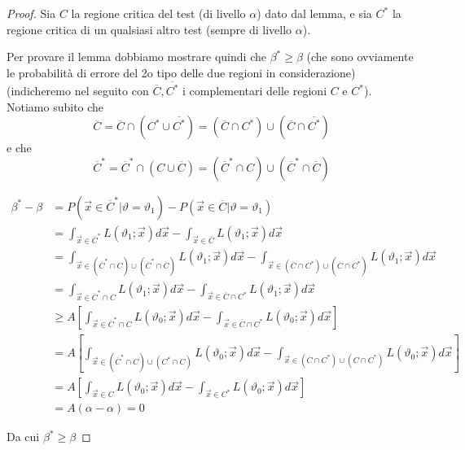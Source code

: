 \begin{proof}

Sia $C$ la regione critica del test (di livello $\alpha$) dato dal lemma, e sia $C^*$ la regione critica di un qualsiasi altro test (sempre di livello $\alpha$).

Per provare il lemma dobbiamo mostrare quindi che $\beta^* \geq \beta$ 
(che sono ovviamente le probabilità di errore del 2o tipo delle due regioni in considerazione)
(indicheremo nel seguito con $\overline{C}, \overline{C^*}$ i complementari delle regioni $C$ e $C^*$).
Notiamo subito che
$$\overline{C} = \overline{C} \cap ({C^*} \cup \overline{C^*}) = (\overline{C} \cap {C^*}) \cup (\overline{C} \cap \overline{C^*})$$
e che 
$$\overline{C}^* = \overline{C}^* \cap ({C} \cup \overline{C}) = (\overline{C}^* \cap {C}) \cup (\overline{C}^* \cap \overline{C})$$

\begin{align*}
\beta^* - \beta 
&= P(\vec{x} \in \overline{C}^* | \vartheta = \vartheta_1) 
	- P(\vec{x} \in \overline{C} | \vartheta = \vartheta_1)
\\ &= \int_{\vec{x} \in \overline{C}^* } L(\vartheta_1;\vec{x}) d \vec{x} 
	- \int_{\vec{x} \in \overline{C} } L(\vartheta_1;\vec{x}) d \vec{x}
\\ &= \int_{\vec{x} \in (\overline{C}^* \cap {C}) \cup (\overline{C}^* \cap \overline{C}) } L(\vartheta_1;\vec{x}) d \vec{x} 
	- \int_{\vec{x} \in (\overline{C} \cap {C^*}) \cup (\overline{C} \cap \overline{C^*}) } L(\vartheta_1;\vec{x}) d \vec{x}
\\ &= \int_{\vec{x} \in \overline{C}^* \cap C } L(\vartheta_1;\vec{x}) d \vec{x} 
	- \int_{\vec{x} \in \overline{C} \cap C^* } L(\vartheta_1;\vec{x}) d \vec{x}
\\ & \geq A \left[  \int_{\vec{x} \in \overline{C}^* \cap C } L(\vartheta_0;\vec{x}) d \vec{x} 
	- \int_{\vec{x} \in \overline{C} \cap C^* } L(\vartheta_0;\vec{x}) d \vec{x} \right]
\\ & = A \left[ \int_{\vec{x} \in (\overline{C}^* \cap {C}) \cup ({C}^* \cap {C}) } L(\vartheta_0;\vec{x}) d \vec{x} 
	- \int_{\vec{x} \in (\overline{C} \cap {C^*}) \cup ({C} \cap {C^*}) } L(\vartheta_0;\vec{x}) d \vec{x} \right]
\\ & = A \left[  \int_{\vec{x} \in C} L(\vartheta_0;\vec{x}) d \vec{x} 
	- \int_{\vec{x} \in C^* } L(\vartheta_0;\vec{x}) d \vec{x} \right]
\\ & = A ( \alpha - \alpha) = 0
\end{align*}

Da cui $\beta^* \geq \beta $
\end{proof}

